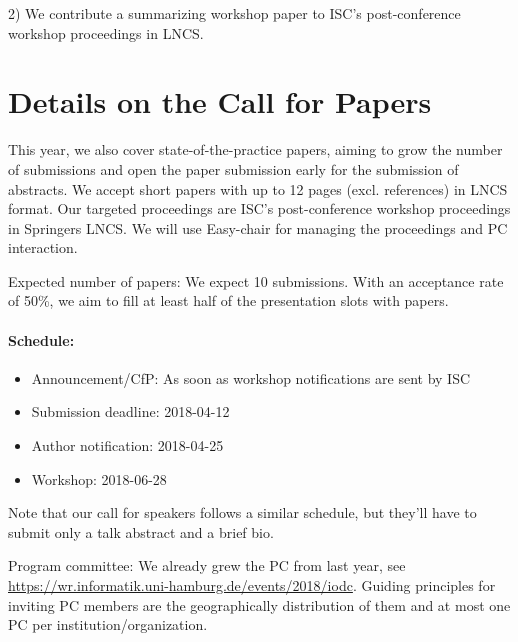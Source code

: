\documentclass[a4paper,10pt]{article}
\begin{document}
2) We contribute a summarizing workshop paper to ISC's post-conference workshop proceedings in LNCS.

\section{Details on the Call for Papers}

This year, we also cover state-of-the-practice papers, aiming to grow the number of submissions and open the paper submission early for the submission of abstracts.
We accept short papers with up to 12 pages (excl. references) in LNCS format.
Our targeted proceedings are ISC's post-conference workshop proceedings in Springers LNCS.
We will use Easy-chair for managing the proceedings and PC interaction.

Expected number of papers: We expect 10 submissions.
With an acceptance rate of 50\%, we aim to fill at least half of the presentation slots with papers.

\paragraph{Schedule:}
\begin{itemize}
  \item Announcement/CfP: As soon as workshop notifications are sent by ISC
  \item Submission deadline: 2018-04-12
  \item Author notification: 2018-04-25
  \item Workshop: 2018-06-28
\end{itemize}
Note that our call for speakers follows a similar schedule, but they'll have to submit only a talk abstract and a brief bio.

Program committee:
We already grew the PC from last year, see \url{https://wr.informatik.uni-hamburg.de/events/2018/iodc}.
Guiding principles for inviting PC members are the geographically distribution of them and at most one PC per institution/organization.
\end{document}
